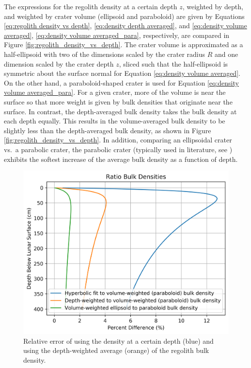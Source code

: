 \documentclass{article}
\begin{document}
The expressions for the regolith density at a certain depth $z$, weighted by depth, and weighted by crater volume (ellipsoid and paraboloid) are given by Equations \eqref{eq:regolith density vs depth}, \eqref{eq:density depth averaged}, and \eqref{eq:density volume averaged}, \eqref{eq:density volume averaged_para}, respectively, are compared in Figure \ref{fig:regolith_density_vs_depth}. The crater volume is approximated as a half-ellipsoid with two of the dimensions scaled by the crater radius $R$ and one dimension scaled by the crater depth $z$, sliced such that the half-ellipsoid is symmetric about the surface normal for Equation \eqref{eq:density volume averaged}. On the other hand, a paraboloid-shaped crater is used for Equation \eqref{eq:density volume averaged_para}. For a given crater, more of the volume is near the surface so that more weight is given by bulk densities that originate near the surface. In contrast, the depth-averaged bulk density takes the bulk density at each depth equally. This results in the volume-averaged bulk density to be slightly less than the depth-averaged bulk density, as shown in Figure \ref{fig:regolith_density_vs_depth}. In addition, comparing an ellipsoidal crater vs.\ a parabolic crater, the parabolic crater (typically used in literature, see \cite{singer2020lunar}) exhibits the softest increase of the average bulk density as a function of depth.


\begin{figure}[!htb]
	\centering
	\includegraphics[width=\linewidth]{ratio_of_avg_bulk_density.png}
	\caption{Relative error of using the density at a certain depth (blue) and using the depth-weighted average (orange) of the regolith bulk density.}
	\label{fig:ratio_of_avg_bulk_density}
\end{figure}
\end{document}

